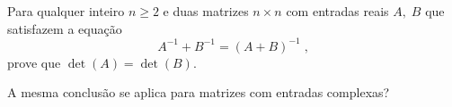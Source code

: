 Para qualquer inteiro \(n\ge 2\) e duas matrizes \(n\times n\) com entradas reais \(A,\; B\) que satisfazem a equação
\[
A^{-1}+B^{-1}=(A+B)^{-1}\;,
\]
prove que \(\det (A)=\det(B)\).

A mesma conclusão se aplica para matrizes com entradas complexas?
